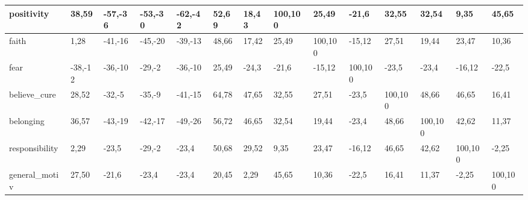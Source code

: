 \begin{table}[H]
\begin{adjustbox}{angle=90}
\begin{tabular} {|l|l|l|l|l|l|l|l|l|l|l|l|l|l|}
 \hline 
 positivity & {\color{green}38,59} & {\color{red}-57,-36} & {\color{red}-53,-30} & {\color{red}-62,-42} & {\color{green}52,69} & {\color{green}18,43} & {\color{green}100,100} & {\color{green}25,49} & -21,6 & {\color{green}32,55} & {\color{green}32,54} & {\color{green}9,35} & {\color{green}45,65} \\ 
 \hline 
 faith & {\color{green}1,28} & {\color{red}-41,-16} & {\color{red}-45,-20} & {\color{red}-39,-13} & {\color{green}48,66} & {\color{green}17,42} & {\color{green}25,49} & {\color{green}100,100} & -15,12 & {\color{green}27,51} & {\color{green}19,44} & {\color{green}23,47} & {\color{green}10,36} \\ 
 \hline 
 fear & {\color{red}-38,-12} & {\color{red}-36,-10} & {\color{red}-29,-2} & {\color{red}-36,-10} & {\color{green}25,49} & -24,3 & -21,6 & -15,12 & {\color{green}100,100} & -23,5 & -23,4 & -16,12 & -22,5 \\ 
 \hline 
 believe\_cure & {\color{green}28,52} & {\color{red}-32,-5} & {\color{red}-35,-9} & {\color{red}-41,-15} & {\color{green}64,78} & {\color{green}47,65} & {\color{green}32,55} & {\color{green}27,51} & -23,5 & {\color{green}100,100} & {\color{green}48,66} & {\color{green}46,65} & {\color{green}16,41} \\ 
 \hline 
 belonging & {\color{green}36,57} & {\color{red}-43,-19} & {\color{red}-42,-17} & {\color{red}-49,-26} & {\color{green}56,72} & {\color{green}46,65} & {\color{green}32,54} & {\color{green}19,44} & -23,4 & {\color{green}48,66} & {\color{green}100,100} & {\color{green}42,62} & {\color{green}11,37} \\ 
 \hline 
 responsibility & {\color{green}2,29} & -23,5 & {\color{red}-29,-2} & -23,4 & {\color{green}50,68} & {\color{green}29,52} & {\color{green}9,35} & {\color{green}23,47} & -16,12 & {\color{green}46,65} & {\color{green}42,62} & {\color{green}100,100} & -2,25 \\ 
 \hline 
 general\_motiv & {\color{green}27,50} & -21,6 & -23,4 & -23,4 & {\color{green}20,45} & {\color{green}2,29} & {\color{green}45,65} & {\color{green}10,36} & -22,5 & {\color{green}16,41} & {\color{green}11,37} & -2,25 & {\color{green}100,100} \\ 
 \hline 
 \hline 
 \end{tabular} 
\end{adjustbox}  
\end{table} 
